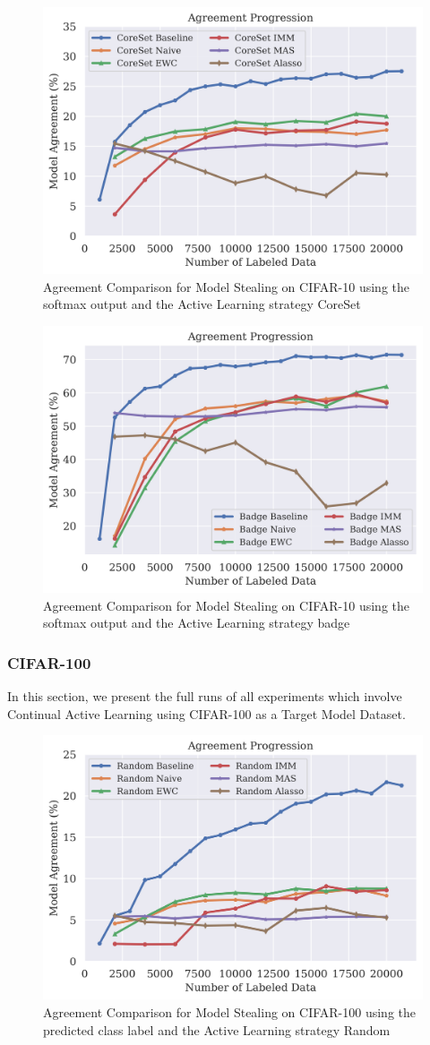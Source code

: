\begin{figure}[!htb]
    \centering
    \includegraphics[width=0.5\linewidth]{images/results_CALMS/cifar100_softmax_coreset.png}
    \caption{Agreement Comparison for Model Stealing on CIFAR-10 using the softmax output and the Active Learning strategy CoreSet}
    \label{fig:CALMSCIFAR10SoftmaxCoreSet}
\end{figure}

\begin{figure}[!htb]
    \centering
    \includegraphics[width=0.5\linewidth]{images/results_CALMS/cifar_softmax_badge.png}
    \caption{Agreement Comparison for Model Stealing on CIFAR-10 using the softmax output and the Active Learning strategy \gls{badge}}
    \label{fig:CALMSCIFAR10SoftmaxBadge}
\end{figure}


\subsubsection{CIFAR-100}
\label{sec:Appendix:CALMS:CIFAR100}
In this section, we present the full runs of all experiments which involve Continual Active Learning using CIFAR-100 as a Target Model Dataset.

\begin{figure}[!htb]
    \centering
    \includegraphics[width=0.5\linewidth]{images/results_CALMS/cifar100_label_random.png}
    \caption{Agreement Comparison for Model Stealing on CIFAR-100 using the predicted class label and the Active Learning strategy Random}
    \label{fig:CALMSCIFAR100LabelRandom}
\end{figure}

